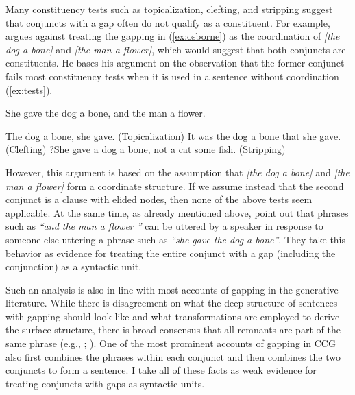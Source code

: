 \documentclass[lucida,biblatex]{sp} %
\newcounter{excounter}
\begin{document}
Many constituency tests such as topicalization, clefting, and stripping suggest that conjuncts with a gap often do not qualify as a constituent. For example, \citet{Osborne2006b} argues against treating the gapping in (\ref{ex:osborne}) as the coordination of \textit{[the dog a bone]} and \textit{[the man a flower]}, which would suggest that both conjuncts are constituents. He bases his argument on the observation that the former conjunct fails most constituency tests when it is used in a sentence without coordination (\ref{ex:tests}).
 
\begin{exe}
 \setcounter{xnumi}{\value{excounter}}
\ex \label{ex:osborne} She gave the dog a bone, and the man a flower.
\ex \label{ex:tests} \begin{xlist}
\ex *The dog a bone, she gave. (Topicalization)
\ex *It was the dog a bone that she gave. (Clefting)
\ex ?She gave a dog a bone, not a cat some fish. (Stripping)
\end{xlist}
\end{exe}

However, this argument is based on the assumption that \textit{[the dog a bone]} and \textit{[the man a flower]} form a coordinate structure. If we assume instead that the second conjunct is a clause with elided nodes, then none of the above tests seem applicable. At the same time, as already mentioned above, \citet{Gerdes2015} point out that phrases such as \textit{``and the man a flower ''} can be uttered by a speaker in response to someone else uttering a phrase such as \textit{``she gave the dog a bone''}. They take this behavior as evidence for treating the entire conjunct with a gap (including the conjunction) as a syntactic unit. 

Such an analysis is also in line with most accounts of gapping in the generative literature. While there is disagreement on what the deep structure of sentences with gapping should look like and what transformations are employed to derive the surface structure, there is broad consensus that all remnants are part of the same phrase (e.g., \cite{Coppock2001}; \cite{Johnson2009}). One of the most prominent accounts of gapping in CCG \citep{Steedman1990} also first combines the phrases within each conjunct and then combines the two conjuncts to form a sentence. I take all of these facts as weak evidence for treating conjuncts with gaps as syntactic units.
\end{document}
